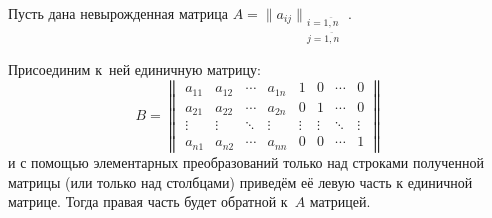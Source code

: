 \begin{theorem}
Пусть дана невырожденная матрица $A = \|a_{ij}\|_{\begin{smallmatrix}
i = \overline{1, n} \\
j = \overline{1, n}
\end{smallmatrix}}$.

Присоединим к~ней единичную матрицу:
\begin{equation*}
B = \begin{Vmatrix}
a_{11} & a_{12} & \cdots & a_{1n} & 1 & 0 & \cdots & 0 \\
a_{21} & a_{22} & \cdots & a_{2n} & 0 & 1 & \cdots & 0 \\
\vdots & \vdots & \ddots & \vdots & \vdots & \vdots & \ddots & \vdots \\
a_{n1} & a_{n2} & \cdots & a_{nn} & 0 & 0 & \cdots & 1
\end{Vmatrix}
\end{equation*}
и с помощью элементарных преобразований только над строками полученной матрицы (или только над столбцами) приведём её левую часть к единичной матрице.
Тогда правая часть будет обратной к~$A$ матрицей.
\end{theorem}
